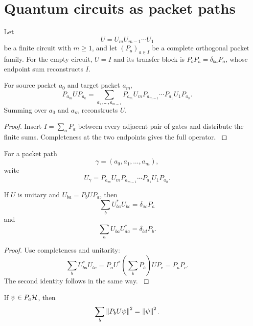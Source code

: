 \section{Quantum circuits as packet paths}\label{strong:section:004}\label{strong:sec:circuits}

Let
\[
U=U_mU_{m-1}\cdots U_1
\]
be a finite circuit with \(m\ge1\), and let \((P_a)_{a\in I}\) be a complete orthogonal packet family. For the empty circuit, \(U=I\) and its transfer block is \(P_bP_a=\delta_{ba}P_a\), whose endpoint sum reconstructs \(I\).

\begin{theorem}\label{strong:theorem:007}\label{strong:thm:circuit_path}
For source packet \(a_0\) and target packet \(a_m\),
\[
P_{a_m}UP_{a_0}
=
\sum_{a_1,\ldots,a_{m-1}}
P_{a_m}U_mP_{a_{m-1}}
\cdots
P_{a_1}U_1P_{a_0}.
\]
Summing over \(a_0\) and \(a_m\) reconstructs \(U\).
\end{theorem}

\begin{proof}\label{strong:proof:012}
Insert \(I=\sum_aP_a\) between every adjacent pair of gates and distribute the finite sums. Completeness at the two endpoints gives the full operator.
\label{strong:proof:012:end}\end{proof}

For a packet path
\[
\gamma=(a_0,a_1,\ldots,a_m),
\]
write
\[
U_\gamma
=
P_{a_m}U_mP_{a_{m-1}}
\cdots
P_{a_1}U_1P_{a_0}.
\]

\begin{theorem}\label{strong:theorem:008}\label{strong:thm:packet_unitarity}
If \(U\) is unitary and \(U_{ba}=P_bUP_a\), then
\[
\sum_bU_{ba}^*U_{bc}=\delta_{ac}P_a
\]
and
\[
\sum_aU_{ba}U_{da}^*=\delta_{bd}P_b.
\]
\end{theorem}

\begin{proof}\label{strong:proof:013}
Use completeness and unitarity:
\[
\sum_bU_{ba}^*U_{bc}
=
P_aU^*\left(\sum_bP_b\right)UP_c
=P_aP_c.
\]
The second identity follows in the same way.
\label{strong:proof:013:end}\end{proof}

\begin{corollary}\label{strong:corollary:005}\label{strong:cor:packet_probability}
If \(\psi\in P_a\Hcal\), then
\[
\sum_b\left\lVert P_bU\psi\right\rVert^2=\left\lVert\psi\right\rVert^2.
\]
\end{corollary}

